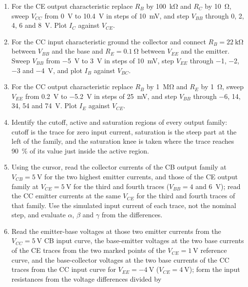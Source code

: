 \documentclass[12pt,a4paper]{article}
\begin{document}
\begin{enumerate}[label=\arabic*., leftmargin=2.4em]
		of the CE output traces read in step~11.
		\item For the CE output characteristic replace $R_B$ by
		\SI{100}{\kilo\ohm} and $R_C$ by \SI{10}{\ohm}, sweep $V_{CC}$
		from \SI{0}{\volt} to \SI{10.4}{\volt} in steps of
		\SI{10}{\milli\volt}, and step $V_{BB}$ through \SI{0}{}, 2, 4,
		6 and \SI{8}{\volt}. Plot $I_C$ against $V_{CE}$.
		\item For the CC input characteristic ground the collector and
		connect $R_B = \SI{22}{\kilo\ohm}$ between $V_{BB}$ and the base
		and $R_E = \SI{0.1}{\ohm}$ between $V_{EE}$ and the emitter.
		Sweep $V_{BB}$ from \SI{-5}{\volt} to \SI{3}{\volt} in steps of
		\SI{10}{\milli\volt}, step $V_{EE}$ through \SI{-1}{},
		\SI{-2}{}, \SI{-3}{} and \SI{-4}{\volt}, and plot $I_B$ against
		$V_{BC}$.
		\item For the CC output characteristic replace $R_B$ by
		\SI{1}{\mega\ohm} and $R_E$ by \SI{1}{\ohm}, sweep $V_{EE}$
		from \SI{0.2}{\volt} to \SI{-5.2}{\volt} in steps of
		\SI{25}{\milli\volt}, and step $V_{BB}$ through \SI{-6}{}, 14,
		34, 54 and \SI{74}{\volt}. Plot $I_E$ against $V_{CE}$.
		\item Identify the cutoff, active and saturation regions of every
		output family: cutoff is the trace for zero input current,
		saturation is the steep part at the left of the family, and the
		saturation knee is taken where the trace reaches
		\SI{90}{\percent} of its value just inside the active region.
		\item Using the cursor, read the collector currents of the CB output
		family at $V_{CB} = \SI{5}{\volt}$ for the two highest emitter
		currents, and those of the CE output family at $V_{CE} =
		\SI{5}{\volt}$ for the third and fourth traces ($V_{BB} = 4$
		and \SI{6}{\volt}); read the CC emitter currents at the same
		$V_{CE}$ for the third and fourth traces of that family. Use the
		simulated input current of each trace, not the nominal step, and
		evaluate $\alpha$, $\beta$ and $\gamma$ from the differences.
		\item Read the emitter-base voltages at those two emitter currents
		from the $V_{CC} = \SI{5}{\volt}$ CB input curve, the
		base-emitter voltages at the two base currents of the CE traces
		from the two marked points of the $V_{CE} = \SI{1}{\volt}$
		reference curve, and the
		base-collector voltages at the two base currents of the CC
		traces from the CC input curve for $V_{EE} = \SI{-4}{\volt}$
		($V_{CE} = \SI{4}{\volt}$); form
		the input resistances from the voltage differences divided by

\end{enumerate}
\end{document}
